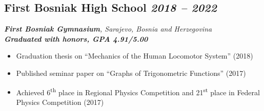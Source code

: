 \subsection*{\textbf{First Bosniak High School} \hfill \textit{2018 -- 2022}}  
\noindent\textit{\textbf{First Bosniak Gymnasium}, Sarajevo, Bosnia and Herzegovina} \\
\noindent\textit{\textbf{Graduated with honors, GPA 4.91/5.00}} 
\begin{itemize}[leftmargin=*,noitemsep,topsep=3pt]
    \item Graduation thesis on \enquote{Mechanics of the Human Locomotor System} (2018)
    \item Published seminar paper on \enquote{Graphs of Trigonometric Functions} (2017)
    \item Achieved 6\textsuperscript{th} place in Regional Physics Competition and 21\textsuperscript{st} place in Federal Physics Competition (2017)
\end{itemize}
\vspace{20pt}